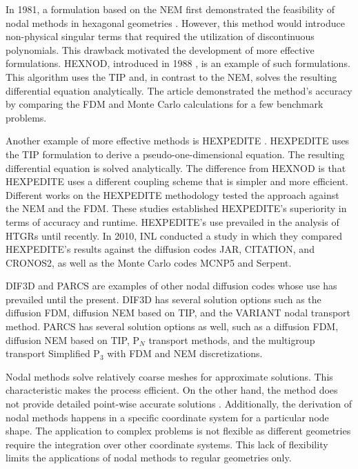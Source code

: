 In 1981, a formulation based on the \gls{NEM} first demonstrated the feasibility of nodal methods in hexagonal geometries \cite{duracz_nodal_1981}.
However, this method would introduce non-physical singular terms that required the utilization of discontinuous polynomials.
This drawback motivated the development of more effective formulations.
HEXNOD, introduced in 1988 \cite{wagner_three-dimensional_1989}, is an example of such formulations.
This algorithm uses the \gls{TIP} and, in contrast to the \gls{NEM}, solves the resulting differential equation analytically.
The article demonstrated the method's accuracy by comparing the \gls{FDM} and Monte Carlo calculations for a few benchmark problems.

Another example of more effective methods is HEXPEDITE \cite{fitzpatrick_hexpedite_1992}.
HEXPEDITE uses the \gls{TIP} formulation to derive a pseudo-one-dimensional equation.
The resulting differential equation is solved analytically.
The difference from HEXNOD is that HEXPEDITE uses a different coupling scheme that is simpler and more efficient.
Different works \cite{fitzpatrick_hexpedite_1992}\cite{fitzpatrick_developments_1995} on the HEXPEDITE methodology tested the approach against the \gls{NEM} and the \gls{FDM}.
These studies established HEXPEDITE’s superiority in terms of accuracy and runtime.
HEXPEDITE's use prevailed in the analysis of \glspl{HTGR} until recently.
In 2010, \gls{INL} conducted a study \cite{ortensi_deterministic_2010-1} in which they compared HEXPEDITE's results against the diffusion codes JAR, CITATION, and CRONOS2, as well as the Monte Carlo codes MCNP5 and Serpent.

DIF3D \cite{lawrence_dif3d_1983} and PARCS \cite{downar_parcs_2004} are examples of other nodal diffusion codes whose use has prevailed until the present.
DIF3D has several solution options such as the diffusion \gls{FDM}, diffusion \gls{NEM} based on \gls{TIP}, and the VARIANT nodal transport method.
PARCS has several solution options as well, such as a diffusion \gls{FDM}, diffusion \gls{NEM} based on \gls{TIP}, P$_{N}$ transport methods, and the multigroup transport Simplified P$_3$ with \gls{FDM} and \gls{NEM} discretizations.

Nodal methods solve relatively coarse meshes for approximate solutions.
This characteristic makes the process efficient.
On the other hand, the method does not provide detailed point-wise accurate solutions \cite{kang_finite_1973}.
Additionally, the derivation of nodal methods happens in a specific coordinate system for a particular node shape.
The application to complex problems is not flexible as different geometries require the integration over other coordinate systems.
This lack of flexibility limits the applications of nodal methods to regular geometries only.

